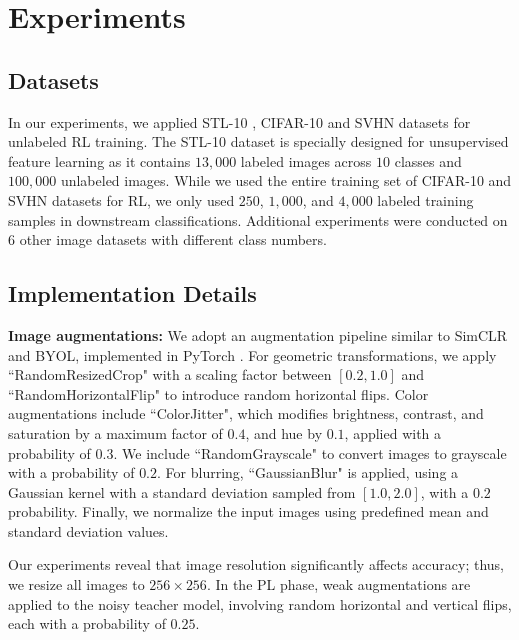 \section{Experiments}

\subsection{Datasets}

In our experiments, we applied STL-10 \cite{singh2019justification}, CIFAR-10 \cite{ho2018cifar10} and SVHN \cite{sermanet2012convolutional} datasets for unlabeled RL training. The STL-10 dataset is specially designed for unsupervised feature learning as it contains $13,000$ labeled images across $10$ classes and $100,000$ unlabeled images. While we used the entire training set of CIFAR-10 and SVHN datasets for RL, we only used $250$, $1,000$, and $4,000$ labeled training samples in downstream classifications. Additional experiments were conducted on 6 other image datasets \cite{krizhevsky2009learning, xiao2017fashionmnist, LFWTech, helber2019eurosat, nilsback2008automated, imagenette2019} with different class numbers.

\subsection{Implementation Details} 

\textbf{Image augmentations:} We adopt an augmentation pipeline similar to SimCLR and BYOL, implemented in PyTorch \cite{paszke2019pytorch}. For geometric transformations, we apply ``RandomResizedCrop" with a scaling factor between \([0.2, 1.0]\) and ``RandomHorizontalFlip" to introduce random horizontal flips. Color augmentations include ``ColorJitter", which modifies brightness, contrast, and saturation by a maximum factor of \(0.4\), and hue by \(0.1\), applied with a probability of \(0.3\). We include ``RandomGrayscale" to convert images to grayscale with a probability of \(0.2\). For blurring, ``GaussianBlur" is applied, using a Gaussian kernel with a standard deviation sampled from \([1.0, 2.0]\), with a \(0.2\) probability. Finally, we normalize the input images using predefined mean and standard deviation values. 

Our experiments reveal that image resolution significantly affects accuracy; thus, we resize all images to \(256 \times 256\). In the PL phase, weak augmentations are applied to the noisy teacher model, involving random horizontal and vertical flips, each with a probability of \(0.25\).

